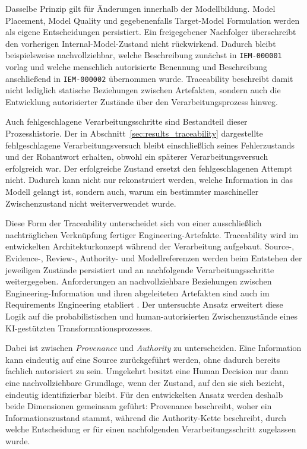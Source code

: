 Dasselbe Prinzip gilt für Änderungen innerhalb der Modellbildung.
Model Placement, Model Quality und gegebenenfalls Target-Model Formulation
werden als eigene Entscheidungen persistiert. Ein freigegebener Nachfolger
überschreibt den vorherigen Internal-Model-Zustand nicht rückwirkend.
Dadurch bleibt beispielsweise nachvollziehbar, welche Beschreibung zunächst
in \texttt{IEM-000001} vorlag und welche menschlich autorisierte Benennung
und Beschreibung anschließend in \texttt{IEM-000002} übernommen wurde. Traceability
beschreibt damit nicht lediglich statische Beziehungen zwischen Artefakten,
sondern auch die Entwicklung autorisierter Zustände über den
Verarbeitungsprozess hinweg.

Auch fehlgeschlagene Verarbeitungsschritte sind Bestandteil dieser
Prozesshistorie. Der in Abschnitt~\ref{sec:results_traceability}
dargestellte fehlgeschlagene Verarbeitungsversuch bleibt einschließlich seines
Fehlerzustands und der Rohantwort erhalten, obwohl ein späterer
Verarbeitungsversuch erfolgreich war. Der erfolgreiche Zustand ersetzt den
fehlgeschlagenen Attempt nicht. Dadurch kann nicht nur rekonstruiert werden,
welche Information in das Modell gelangt ist, sondern auch, warum ein
bestimmter maschineller Zwischenzustand nicht weiterverwendet wurde.

Diese Form der Traceability unterscheidet sich von einer ausschließlich
nachträglichen Verknüpfung fertiger Engineering-Artefakte. Traceability wird
im entwickelten Architekturkonzept während der Verarbeitung aufgebaut.
Source-, Evidence-, Review-, Authority- und Modellreferenzen werden beim
Entstehen der jeweiligen Zustände persistiert und an nachfolgende
Verarbeitungsschritte weitergegeben. Anforderungen an nachvollziehbare
Beziehungen zwischen Engineering-Information und ihren abgeleiteten
Artefakten sind auch im Requirements Engineering etabliert
\cite{ISO29148}. Der untersuchte Ansatz erweitert diese Logik auf die
probabilistischen und human-autorisierten Zwischenzustände eines
KI-gestützten Transformationsprozesses.

Dabei ist zwischen \emph{Provenance} und \emph{Authority} zu unterscheiden.
Eine Information kann eindeutig auf eine Source zurückgeführt werden, ohne
dadurch bereits fachlich autorisiert zu sein. Umgekehrt besitzt eine Human
Decision nur dann eine nachvollziehbare Grundlage, wenn der Zustand, auf den
sie sich bezieht, eindeutig identifizierbar bleibt. Für den entwickelten
Ansatz werden deshalb beide Dimensionen gemeinsam geführt: Provenance
beschreibt, woher ein Informationszustand stammt, während die
Authority-Kette beschreibt, durch welche Entscheidung er für einen
nachfolgenden Verarbeitungsschritt zugelassen wurde.

